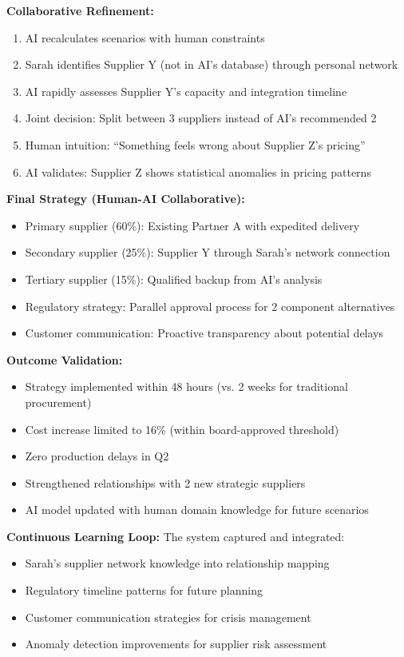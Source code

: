\documentclass{article}
\begin{document}
\textbf{Collaborative Refinement:}
\begin{enumerate}
\item AI recalculates scenarios with human constraints
\item Sarah identifies Supplier Y (not in AI's database) through personal network
\item AI rapidly assesses Supplier Y's capacity and integration timeline
\item Joint decision: Split between 3 suppliers instead of AI's recommended 2
\item Human intuition: ``Something feels wrong about Supplier Z's pricing''
\item AI validates: Supplier Z shows statistical anomalies in pricing patterns
\end{enumerate}

\textbf{Final Strategy (Human-AI Collaborative):}
\begin{itemize}
\item Primary supplier (60\%): Existing Partner A with expedited delivery
\item Secondary supplier (25\%): Supplier Y through Sarah's network connection
\item Tertiary supplier (15\%): Qualified backup from AI's analysis
\item Regulatory strategy: Parallel approval process for 2 component alternatives
\item Customer communication: Proactive transparency about potential delays
\end{itemize}

\textbf{Outcome Validation:}
\begin{itemize}
\item Strategy implemented within 48 hours (vs. 2 weeks for traditional procurement)
\item Cost increase limited to 16\% (within board-approved threshold)
\item Zero production delays in Q2
\item Strengthened relationships with 2 new strategic suppliers
\item AI model updated with human domain knowledge for future scenarios
\end{itemize}

\textbf{Continuous Learning Loop:}
The system captured and integrated:
\begin{itemize}
\item Sarah's supplier network knowledge into relationship mapping
\item Regulatory timeline patterns for future planning
\item Customer communication strategies for crisis management
\item Anomaly detection improvements for supplier risk assessment
\end{itemize}
\end{document}
